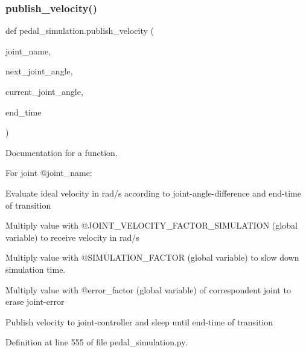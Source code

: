\subsubsection{\texorpdfstring{publish\_velocity()}{publish\_velocity()}}
{\footnotesize\ttfamily def pedal\+\_\+simulation.\+publish\+\_\+velocity (\begin{DoxyParamCaption}\item[{}]{joint\+\_\+name,  }\item[{}]{next\+\_\+joint\+\_\+angle,  }\item[{}]{current\+\_\+joint\+\_\+angle,  }\item[{}]{end\+\_\+time }\end{DoxyParamCaption})}



Documentation for a function. 

For joint @joint\+\_\+name\+:


\begin{DoxyItemize}
\item Evaluate ideal velocity in rad/s according to joint-\/angle-\/difference and end-\/time of transition
\item Multiply value with @\+J\+O\+I\+N\+T\+\_\+\+V\+E\+L\+O\+C\+I\+T\+Y\+\_\+\+F\+A\+C\+T\+O\+R\+\_\+\+S\+I\+M\+U\+L\+A\+T\+I\+ON (global variable) to receive velocity in rad/s
\item Multiply value with @\+S\+I\+M\+U\+L\+A\+T\+I\+O\+N\+\_\+\+F\+A\+C\+T\+OR (global variable) to slow down simulation time.
\item Multiply value with @error\+\_\+factor (global variable) of correspondent joint to erase joint-\/error
\item Publish velocity to joint-\/controller and sleep until end-\/time of transition 
\end{DoxyItemize}

Definition at line 555 of file pedal\+\_\+simulation.\+py.


